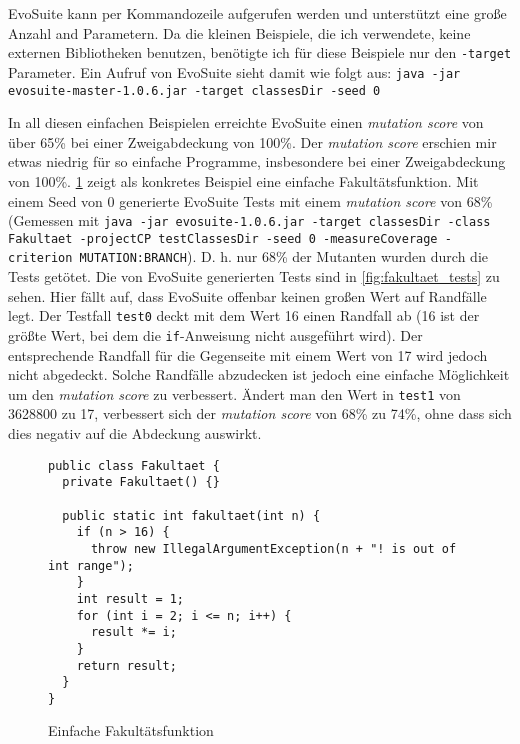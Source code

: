 \documentclass[a4paper,11pt]{article}
\begin{document}
EvoSuite kann per Kommandozeile aufgerufen werden und unterstützt eine große Anzahl and Parametern.
Da die kleinen Beispiele, die ich verwendete, keine externen Bibliotheken benutzen, benötigte ich für diese Beispiele nur den \texttt{-target} Parameter.
Ein Aufruf von EvoSuite sieht damit wie folgt aus: \texttt{java -jar evosuite-master-1.0.6.jar -target classesDir -seed 0}

In all diesen einfachen Beispielen erreichte EvoSuite einen \textit{mutation score} von über 65\% bei einer Zweigabdeckung von 100\%.
Der \textit{mutation score} erschien mir etwas niedrig für so einfache Programme, insbesondere bei einer Zweigabdeckung von 100\%.
\cref{fig:fakultaet} zeigt als konkretes Beispiel eine einfache Fakultätsfunktion.
Mit einem Seed von 0 generierte EvoSuite Tests mit einem \textit{mutation score} von 68\% (Gemessen mit \texttt{java -jar evosuite-1.0.6.jar -target classesDir -class Fakultaet -projectCP testClassesDir -seed 0 -measureCoverage -criterion MUTATION:BRANCH}).
D. h. nur 68\% der Mutanten wurden durch die Tests getötet.
Die von EvoSuite generierten Tests sind in \cref{fig:fakultaet_tests} zu sehen.
Hier fällt auf, dass EvoSuite offenbar keinen großen Wert auf Randfälle legt.
Der Testfall \texttt{test0} deckt mit dem Wert 16 einen Randfall ab (16 ist der größte Wert, bei dem die \lstinline{if}-Anweisung nicht ausgeführt wird).
Der entsprechende Randfall für die Gegenseite mit einem Wert von 17 wird jedoch nicht abgedeckt.
Solche Randfälle abzudecken ist jedoch eine einfache Möglichkeit um den \textit{mutation score} zu verbessert.
Ändert man den Wert in \texttt{test1} von 3628800 zu 17, verbessert sich der \textit{mutation score} von 68\% zu 74\%, ohne dass sich dies negativ auf die Abdeckung auswirkt.

\begin{figure}[h]
	\begin{lstlisting}[basicstyle=\ttfamily\tiny]
public class Fakultaet {
  private Fakultaet() {}

  public static int fakultaet(int n) {
    if (n > 16) {
      throw new IllegalArgumentException(n + "! is out of int range");
    }
    int result = 1;
    for (int i = 2; i <= n; i++) {
      result *= i;
    }
    return result;
  }
}
	\end{lstlisting}
	\caption{Einfache Fakultätsfunktion}
	\label{fig:fakultaet}
\end{figure}
\end{document}
